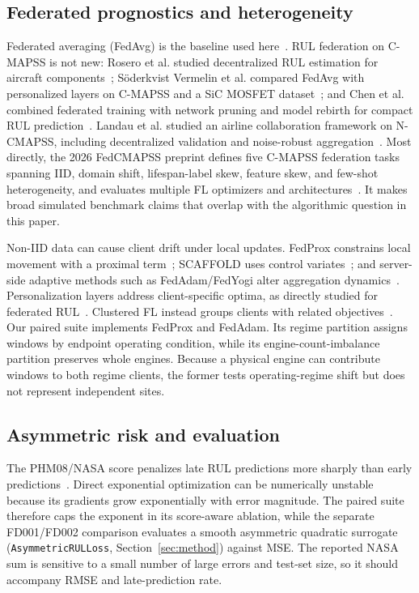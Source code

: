 \subsection{Federated prognostics and heterogeneity}
Federated averaging (FedAvg) is the baseline used here~\cite{mcmahan2017fedavg}. RUL federation on C-MAPSS is not new: Rosero et al. studied decentralized RUL estimation for aircraft components~\cite{rosero2020federated}; S\"oderkvist Vermelin et al. compared FedAvg with personalized layers on C-MAPSS and a SiC MOSFET dataset~\cite{soderkvist2024collaborative}; and Chen et al. combined federated training with network pruning and model rebirth for compact RUL prediction~\cite{chen2023pruning}. Landau et al. studied an airline collaboration framework on N-CMAPSS, including decentralized validation and noise-robust aggregation~\cite{landau2025aircraftfl}. Most directly, the 2026 FedCMAPSS preprint defines five C-MAPSS federation tasks spanning IID, domain shift, lifespan-label skew, feature skew, and few-shot heterogeneity, and evaluates multiple FL optimizers and architectures~\cite{sorrenti2026fedcmapss}. It makes broad simulated benchmark claims that overlap with the algorithmic question in this paper.

Non-IID data can cause client drift under local updates. FedProx constrains local movement with a proximal term~\cite{li2020fedprox}; SCAFFOLD uses control variates~\cite{karimireddy2020scaffold}; and server-side adaptive methods such as FedAdam/FedYogi alter aggregation dynamics~\cite{reddi2021adaptive}. Personalization layers address client-specific optima, as directly studied for federated RUL~\cite{soderkvist2024collaborative}. Clustered FL instead groups clients with related objectives~\cite{sattler2021clustered}. Our paired suite implements FedProx and FedAdam. Its regime partition assigns windows by endpoint operating condition, while its engine-count-imbalance partition preserves whole engines. Because a physical engine can contribute windows to both regime clients, the former tests operating-regime shift but does not represent independent sites.

\subsection{Asymmetric risk and evaluation}
The PHM08/NASA score penalizes late RUL predictions more sharply than early predictions~\cite{saxena2008damage,saxena2008metrics}. Direct exponential optimization can be numerically unstable because its gradients grow exponentially with error magnitude. The paired suite therefore caps the exponent in its score-aware ablation, while the separate FD001/FD002 comparison evaluates a smooth asymmetric quadratic surrogate (\texttt{AsymmetricRULLoss}, Section~\ref{sec:method}) against MSE. The reported NASA sum is sensitive to a small number of large errors and test-set size, so it should accompany RMSE and late-prediction rate.

